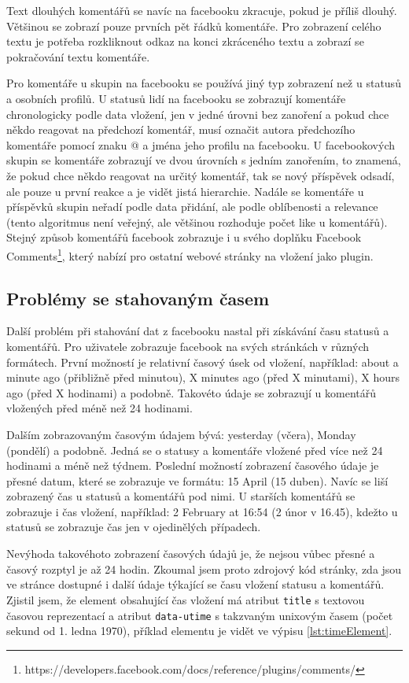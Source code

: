 \documentclass[thesis=M,czech]{FITthesis}[2013/05/10]
\begin{document}
Text dlouhých komentářů se navíc na facebooku zkracuje, pokud je příliš dlouhý. Většinou se zobrazí pouze prvních pět řádků komentáře. Pro zobrazení celého textu je potřeba rozkliknout odkaz na konci zkráceného textu a zobrazí se pokračování textu komentáře. 

Pro komentáře u skupin na facebooku se používá jiný typ zobrazení než u statusů a osobních profilů. U statusů lidí na facebooku se zobrazují komentáře chronologicky podle data vložení, jen v jedné úrovni bez zanoření a pokud chce někdo reagovat na předchozí komentář, musí označit autora předchozího komentáře pomocí znaku @ a jména jeho profilu na facebooku. U facebookových skupin se komentáře zobrazují ve dvou úrovních s jedním zanořením, to znamená, že pokud chce někdo reagovat na určitý komentář, tak se nový příspěvek odsadí, ale pouze u první reakce a je vidět jistá hierarchie. Nadále se komentáře u příspěvků skupin neřadí podle data přidání, ale podle oblíbenosti a relevance (tento algoritmus není veřejný, ale většinou rozhoduje počet like u komentářů). Stejný způsob komentářů facebook zobrazuje i u svého doplňku Facebook Comments\footnote{https://developers.facebook.com/docs/reference/plugins/comments/}, který nabízí pro ostatní webové stránky na vložení jako plugin. 

\subsection{Problémy se stahovaným časem}

Další problém při stahování dat z facebooku nastal při získávání času statusů a komentářů. Pro uživatele zobrazuje facebook na svých stránkách v různých formátech. První možností je relativní časový úsek od vložení, například: about a minute ago (přibližně před minutou), X minutes ago (před X minutami), X hours ago (před X hodinami) a podobně. Takovéto údaje se zobrazují u komentářů vložených před méně než 24 hodinami. 

Dalším zobrazovaným časovým údajem bývá: yesterday (včera), Monday (pondělí) a podobně. Jedná se o statusy a komentáře vložené před více než 24 hodinami a méně než týdnem. Poslední možností zobrazení časového údaje je přesné datum, které se zobrazuje ve formátu: 15 April (15 duben). Navíc se liší zobrazený čas u statusů a komentářů pod nimi. U starších komentářů se zobrazuje i čas vložení, například: 2 February at 16:54 (2 únor v 16.45), kdežto u statusů se zobrazuje čas jen v ojedinělých případech.

Nevýhoda takovéhoto zobrazení časových údajů je, že nejsou vůbec přesné a časový rozptyl je až 24 hodin. Zkoumal jsem proto zdrojový kód stránky, zda jsou ve stránce dostupné i další údaje týkající se času vložení statusu a komentářů. Zjistil jsem, že element obsahující čas vložení má atribut \verb|title| s textovou časovou reprezentací a atribut \verb|data-utime| s takzvaným unixovým časem (počet sekund od 1. ledna 1970), příklad elementu je vidět ve výpisu \ref{lst:timeElement}. 
\end{document}
